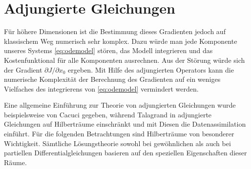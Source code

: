 \section{Adjungierte Gleichungen}
Für höhere Dimensionen ist die Bestimmung dieses Gradienten jedoch auf klassischem Weg numerisch sehr komplex. Dazu würde man jede Komponente unseres Systems \eqref{eq:odemodel} stören, das Modell integrieren und das Kostenfunktional für alle Komponenten ausrechnen. Aus der Störung würde sich der Gradient $\partial J/\partial x_0$ ergeben. Mit Hilfe des adjungierten Operators kann die numerische Komplexität der Berechnung des Gradienten auf ein weniges Vielfaches des integrierens von \eqref{eq:odemodel} vermindert werden.

Eine allgemeine Einführung zur Theorie von adjungierten Gleichungen wurde beispielsweise von Cacuci \cite{cacuci1981sensitivity} gegeben, während Talagrand in \cite{talagrand1987variational} adjungierte Gleichungen auf Hilberträume einschränkt und mit Diesen die Datenassimilation einführt.
Für die folgenden Betrachtungen sind Hilberträume von besonderer Wichtigkeit. Sämtliche Lösungstheorie sowohl bei gewöhnlichen als auch bei partiellen Differentialgleichungen basieren auf den speziellen Eigenschaften dieser Räume.

